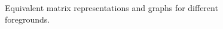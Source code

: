 \begin{figure}[t]
  \begin{center}
    
    \caption{Equivalent matrix representations and graphs for different foregrounds.}
    \label{fig:fragments}
  \end{center}
\end{figure}
